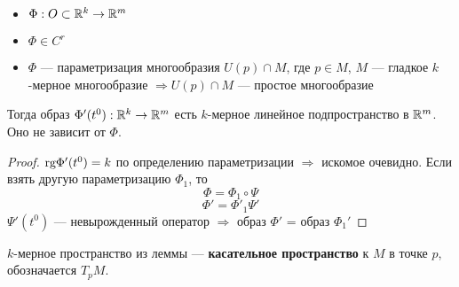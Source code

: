 

\cfoot{}



\begin{lemma}\itemfix
    \begin{itemize}
        \item $\Phi : O\subset\mathbb{R}^k \to\mathbb{R}^m$
        \item $\Phi\in C^r$
        \item $\Phi$ --- параметризация многообразия $U(p)\cap M$, где $p\in M$, $M$ --- гладкое $k$-мерное многообразие $\Rightarrow U(p)\cap M$ --- простое многообразие
    \end{itemize}
    Тогда образ $\Phi'(t^0) : \mathbb{R}^k \to \mathbb{R}^m$ есть $k$-мерное линейное подпространство в $\mathbb{R}^m$. Оно не зависит от $\Phi$.
\end{lemma}
\begin{proof}
    $\text{rg} \Phi'(t^0) = k$ по определению параметризации $\Rightarrow$ искомое очевидно. Если взять другую параметризацию $\Phi_1$, то $$\Phi = \Phi_1 \circ \Psi$$
    $$\Phi' = \Phi'_1 \Psi'$$
    $\Psi'(t^0)$ --- невырожденный оператор $\Rightarrow$ образ $\Phi'$ = образ $\Phi_1'$
\end{proof}

\begin{definition}
    $k$-мерное пространство из леммы --- \textbf{касательное пространство} к $M$ в точке $p$, обозначается $T_pM$.
\end{definition}

